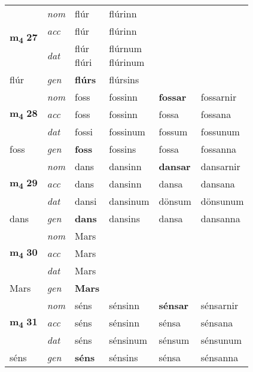 \begin{longtable}[l]{X>{\footnotesize\itshape}XXXXX}
\multirow{3}{*}{{{\textbf{m{\textsubscript{4}}} \Large{\textbf{27}}}}}  
 & nom & flúr & flúrinn    & \textbf{} &   \\*
 & acc & flúr  & flúrinn   &   &  \\*
 & dat & \specialcell{flúr\\ flúri} & \specialcell{flúrnum\\ flúrinum}   &  &  \\*
 {\footnotesize{flúr}} &  gen & \textbf{flúrs}  & flúrsins  &  &  \\
\cmidrule{1-6}


\multirow{3}{*}{{{\textbf{m{\textsubscript{4}}} \Large{\textbf{28}}}}}  
 & nom & foss & fossinn    & \textbf{fossar} & fossarnir  \\*
 & acc & foss  & fossinn   & fossa  & fossana \\*
 & dat & fossi & fossinum   & fossum & fossunum \\*
 {\footnotesize{foss}} &  gen & \textbf{foss}  & fossins  & fossa & fossanna \\
\cmidrule{1-6}


\multirow{3}{*}{{{\textbf{m{\textsubscript{4}}} \Large{\textbf{29}}}}}  
 & nom & dans & dansinn    & \textbf{dansar} & dansarnir  \\*
 & acc & dans  & dansinn   & dansa  & dansana \\*
 & dat & dansi & dansinum   & dönsum & dönsunum \\*
 {\footnotesize{dans}} &  gen & \textbf{dans}  & dansins  & dansa & dansanna \\
\cmidrule{1-6}


\multirow{3}{*}{{{\textbf{m{\textsubscript{4}}} \Large{\textbf{30}}}}}  
 & nom & Mars &     & \textbf{} &   \\*
 & acc & Mars  &    &   &  \\*
 & dat & Mars &    &  &  \\*
 {\footnotesize{Mars}} &  gen & \textbf{Mars}  &   &  &  \\
\cmidrule{1-6}


\multirow{3}{*}{{{\textbf{m{\textsubscript{4}}} \Large{\textbf{31}}}}}  
 & nom & séns & sénsinn    & \textbf{sénsar} & sénsarnir  \\*
 & acc & séns  & sénsinn   & sénsa  & sénsana \\*
 & dat & séns & sénsinum   & sénsum & sénsunum \\*
 {\footnotesize{séns}} &  gen & \textbf{séns}  & sénsins  & sénsa & sénsanna \\
\cmidrule{1-6}



\end{longtable}
